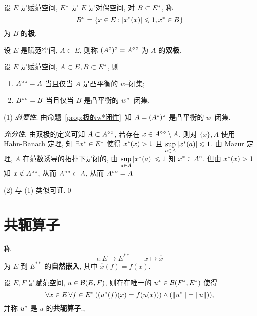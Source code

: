 	\begin{Definition}[对偶空间的极]\label{def:对偶空间的极}
		设 $ E $ 是赋范空间, $ E^{*} $ 是 $ E $ 是对偶空间, 对 $ B\subset E^{*} $, 称
		\[
			B^{\circ}=\{ x\in E:\left| x^{*}(x) \right| \leqslant1, x^{*}\in B \}
		\]
		为 $ B $ 的\textbf{极}.
	\end{Definition}
	\begin{Definition}[双极]\label{def:双极}
		设 $ E $ 是赋范空间, $ A\subset E $, 则称 $ (A^{\circ})^{\circ}=A^{\circ}{}^{\circ} $ 为 $ A $ 的\textbf{双极}.
	\end{Definition}

	\begin{Theorem}[双极定理]\label{thm:双极定理}

		设 $ E $ 是赋范空间, $ A\subset E, B\subset E^{*} $, 则
		\begin{enumerate}[(1)]
			\item $ A^{\circ}{}^{\circ}=A $ 当且仅当 $ A $ 是凸平衡的 $ w $--闭集;
			\item $ B^{\circ}{}^{\circ}=B $ 当且仅当 $ B $ 是凸平衡的 $ w^{*} $--闭集.
		\end{enumerate}
	\end{Theorem}
	\begin{Proof}
		(1) \textsl{必要性}. 由命题~\ref{prop:极的w*闭性}~知 $ A=(A^{\circ})^{\circ} $ 是凸平衡的 $ w $--闭集.

		\textsl{充分性}. 由双极的定义可知 $ A\subset A^{\circ}{}^{\circ} $, 若存在 $ x\in A^{\circ}{}^{\circ}\setminus A $, 则对 $ \{ x \}, A $ 使用 Hahn-Banach 定理, 知 $ \exists x^{*}\in E^{*} $ 使得 $ x^{*}(x)>1 $ 且 $ \sup\limits_{a\in A}\left| x^{*}(a) \right| \leqslant1 $. 由 Mazur 定理, $ A $ 在范数诱导的拓扑下是闭的, 由 $ \sup\limits_{a\in A}\left| x^{*}(a) \right| \leqslant1 $ 知 $ x^{*}\in A^{\circ} $. 但由 $ x^{*}(x)>1 $ 知 $ x\notin A^{\circ}{}^{\circ} $, 从而 $ A^{\circ}{}^{\circ}\subset A $, 从而 $ A^{\circ}{}^{\circ}= A $

		(2) 与 (1) 类似可证.\qed
	\end{Proof}
\section{共轭算子}
	\begin{Definition}[自然嵌入]\label{def:自然嵌入}
		称
		\[
			\iota: E\to E^{**}\qquad x\mapsto \hat{x}
		\]
		为 $ E $ 到 $ E^{**} $ 的\textbf{自然嵌入}, 其中 $ \hat{x}(f)=f(x) $.
	\end{Definition}
	\begin{Theorem}
		设 $ E, F $ 是赋范空间, $ u\in\mathcal{B}(E, F) $, 则存在唯一的 $ u^{*}\in\mathcal{B}(F^{*}, E^{*}) $ 使得
		\[
			\forall x\in E\,\forall f\in E^{*}\,((u^{*}(f)(x)=f(u(x)))\land (\left\| u^{*} \right\|=\left\| u \right\|)),
		\]
		并称 $ u^{*} $ 是 $ u $ 的\textbf{共轭算子}.,
	\end{Theorem}

